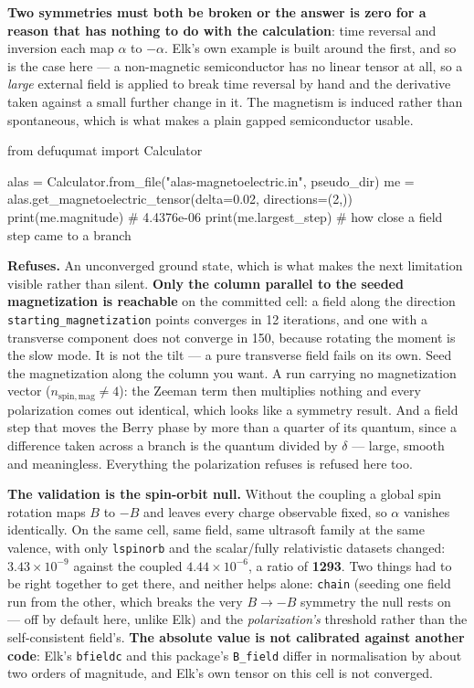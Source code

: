 \documentclass[11pt,a4paper]{article}
\newcommand{\code}[1]{\texttt{\small #1}}
\begin{document}
\textbf{Two symmetries must both be broken or the answer is zero for a reason
that has nothing to do with the calculation}: time reversal and inversion each
map $\alpha$ to $-\alpha$. Elk's own example is built around the first, and so is
the case here --- a non-magnetic semiconductor has no linear tensor at all, so a
\emph{large} external field is applied to break time reversal by hand and the
derivative taken against a small further change in it. The magnetism is induced
rather than spontaneous, which is what makes a plain gapped semiconductor usable.

\begin{pycode}
from defuqumat import Calculator

alas = Calculator.from_file("alas-magnetoelectric.in", pseudo_dir)
me = alas.get_magnetoelectric_tensor(delta=0.02, directions=(2,))
print(me.magnitude)        # 4.4376e-06
print(me.largest_step)     # how close a field step came to a branch
\end{pycode}

\begin{refuses}
\textbf{Refuses.} An unconverged ground state, which is what makes the next
limitation visible rather than silent. \textbf{Only the column parallel to the
seeded magnetization is reachable} on the committed cell: a field along the
direction \code{starting\_magnetization} points converges in 12 iterations, and
one with a transverse component does not converge in 150, because rotating the
moment is the slow mode. It is not the tilt --- a pure transverse field fails on
its own. Seed the magnetization along the column you want. A run carrying no
magnetization vector ($n_{\mathrm{spin,mag}} \neq 4$): the Zeeman term then multiplies nothing and every polarization comes out
identical, which looks like a symmetry result. And a field step that moves the
Berry phase by more than a quarter of its quantum, since a difference taken across
a branch is the quantum divided by $\delta$ --- large, smooth and meaningless.
Everything the polarization refuses is refused here too.
\end{refuses}

\textbf{The validation is the spin-orbit null.} Without the coupling a global spin
rotation maps $B$ to $-B$ and leaves every charge observable fixed, so $\alpha$
vanishes identically. On the same cell, same field, same ultrasoft family at the
same valence, with only \code{lspinorb} and the scalar/fully relativistic datasets
changed: $3.43\times10^{-9}$ against the coupled $4.44\times10^{-6}$, a ratio of
\textbf{1293}. Two things had to be right together to get there, and neither helps
alone: \code{chain} (seeding one field run from the other, which breaks the very
$B \to -B$ symmetry the null rests on --- off by default here, unlike Elk) and the
\emph{polarization's} threshold rather than the self-consistent field's.
\textbf{The absolute value is not calibrated against another code}: Elk's
\code{bfieldc} and this package's \code{B\_field} differ in normalisation by about
two orders of magnitude, and Elk's own tensor on this cell is not converged.
\end{document}
